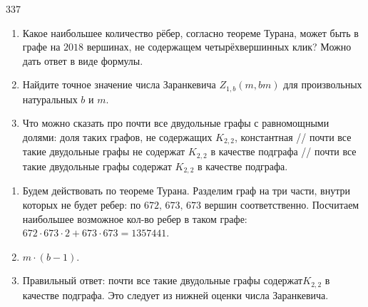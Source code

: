 \begin{task}{337}
\begin{enumerate}
\item Какое наибольшее количество рёбер, согласно теореме Турана, может быть в графе на $2018$ вершинах, не содержащем четырёхвершинных клик? Можно дать ответ в виде формулы.\newline
\item Найдите точное значение числа Заранкевича ${Z}_{1,b}(m,bm)$ для произвольных натуральных $b$ и $m$.\newline
\item Что можно сказать про почти все двудольные графы с равномощными долями: доля таких графов, не содержащих $K_{2,2}$, константная // почти все такие двудольные графы не содержат $K_{2,2}$ в качестве подграфа // почти все такие двудольные графы содержат $K_{2,2}$ в качестве подграфа.
\end{enumerate}
\end{task}

\begin{solution}

\begin{enumerate}
 \item Будем действовать по теореме Турана. Разделим граф на три части, внутри которых не будет ребер: по  $672,\, 673,\, 673$ вершин соответственно. Посчитаем наибольшее возможное кол-во ребер в таком графе: $672\cdot673 \cdot 2 + 673\cdot673 = 1357441$.\par
 \item $m\cdot(b-1)$.\par
 \item Правильный ответ: почти все такие двудольные графы содержат$K_{2,2}$ в качестве подграфа. Это следует из нижней оценки числа Заранкевича.\par
\end{enumerate}
\end{solution}
